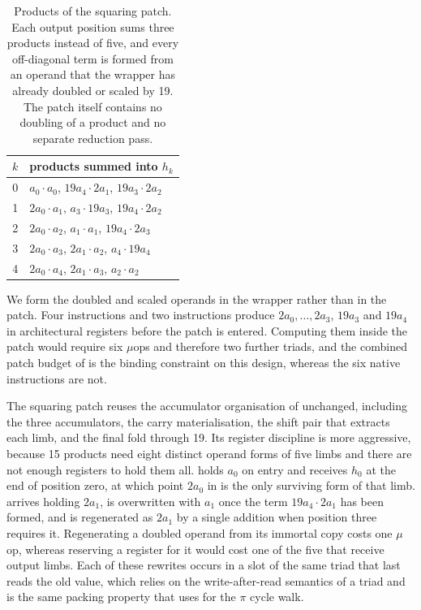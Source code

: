 \begin{table}[htbp]
\centering
\caption{Products of the squaring patch. Each output position sums three products
instead of five, and every off-diagonal term is formed from an operand that the
wrapper has already doubled or scaled by 19. The patch itself contains no doubling
of a product and no separate reduction pass.}
\label{tab:c25519-sqproducts}
\footnotesize
\setlength{\tabcolsep}{6pt}
\begin{tabular}{@{}cl@{}}
\toprule
$k$ & products summed into $h_k$ \\
\midrule
0 & $a_0\!\cdot\!a_0$, \quad $19a_4\!\cdot\!2a_1$, \quad $19a_3\!\cdot\!2a_2$ \\
1 & $2a_0\!\cdot\!a_1$, \quad $a_3\!\cdot\!19a_3$, \quad $19a_4\!\cdot\!2a_2$ \\
2 & $2a_0\!\cdot\!a_2$, \quad $a_1\!\cdot\!a_1$, \quad $19a_4\!\cdot\!2a_3$ \\
3 & $2a_0\!\cdot\!a_3$, \quad $2a_1\!\cdot\!a_2$, \quad $a_4\!\cdot\!19a_4$ \\
4 & $2a_0\!\cdot\!a_4$, \quad $2a_1\!\cdot\!a_3$, \quad $a_2\!\cdot\!a_2$ \\
\bottomrule
\end{tabular}
\end{table}

We form the doubled and scaled operands in the wrapper rather than in the patch.
Four  instructions and two  instructions produce
$2a_0,\ldots,2a_3$, $19a_3$ and $19a_4$ in architectural registers before the
patch is entered.
Computing them inside the patch would require six $\mu$ops and therefore two
further triads, and the combined patch budget of  is the
binding constraint on this design, whereas the six native instructions are not.

The squaring patch reuses the accumulator organisation of
 unchanged, including the three accumulators, the
 carry materialisation, the shift pair that extracts each limb, and
the final fold through 19.
Its register discipline is more aggressive, because 15 products need eight distinct
operand forms of five limbs and there are not enough registers to hold them all.
 holds $a_0$ on entry and receives $h_0$ at the end of position zero, at
which point $2a_0$ in  is the only surviving form of that limb.
 arrives holding $2a_1$, is overwritten with $a_1$ once the term
$19a_4\cdot2a_1$ has been formed, and is regenerated as $2a_1$ by a single
addition when position three requires it.
Regenerating a doubled operand from its immortal copy costs one $\mu$op, whereas
reserving a register for it would cost one of the five that receive output limbs.
Each of these rewrites occurs in a slot of the same triad that last reads the old
value, which relies on the write-after-read semantics of a triad and is the same
packing property that  uses for the $\pi$ cycle walk.

